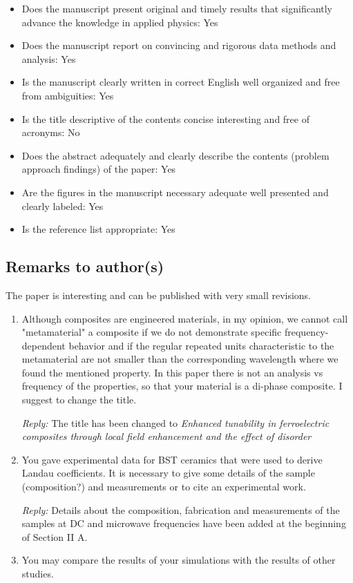 \documentclass[%
 aip,
 amsmath,amssymb,
 reprint,%
]{revtex4-1}
\newcommand{\rep}[1]{\textcolor{reply}{\textit{Reply:} #1}}
\begin{document}
\begin{itemize}
  \item Does the manuscript present original and timely results that significantly advance the knowledge in
   applied physics: Yes
  \item Does the manuscript report on convincing and rigorous data methods and analysis: Yes
  \item Is the manuscript clearly written in correct English well organized and free from ambiguities: Yes
  \item Is the title descriptive of the contents concise interesting and free of acronyms: No
  \item Does the abstract adequately and clearly describe the contents (problem approach findings) of the
   paper: Yes
  \item Are the figures in the manuscript necessary adequate well presented and clearly labeled: Yes
  \item Is the reference list appropriate: Yes

\end{itemize}


\subsection{Remarks to author(s)}

  The paper is interesting and can be published with very small revisions.

  \begin{enumerate}
  \item Although composites are engineered materials, in my opinion, we cannot call "metamaterial" a
   composite if we do not demonstrate specific frequency-dependent behavior and if the regular repeated
    units characteristic to the metamaterial are not smaller than the corresponding wavelength where we
     found the mentioned property. In this paper there is not an analysis vs frequency of the properties,
      so that your material is a di-phase composite. I suggest to change the title.

\rep{The title has been changed to \textit{Enhanced tunability in ferroelectric composites through local field
enhancement and the effect of disorder}}

  \item You gave experimental data for BST ceramics that were used to derive Landau coefficients. It is
   necessary to give some details of the sample (composition?) and measurements or to cite an experimental
    work.

    \rep{Details about the composition, fabrication and measurements of the samples at DC and microwave frequencies have been added at the beginning of Section II A.}



  \item You may compare the results of your simulations with the results of other studies.


\end{enumerate}
\end{document}
